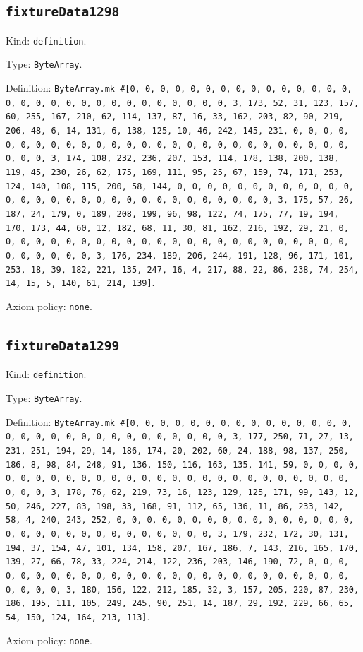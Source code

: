 \documentclass[11pt]{article}
\begin{document}
\subsection*{\texttt{fixtureData1298}}
\noindent Kind: \texttt{definition}.\par
\noindent Type: \texttt{ByteArray}.\par
\noindent Definition: \texttt{ByteArray.mk \#[0, 0, 0, 0, 0, 0, 0, 0, 0, 0, 0, 0, 0, 0, 0, 0, 0, 0, 0, 0, 0, 0, 0, 0, 0, 0, 0, 0, 0, 0, 3, 173, 52, 31, 123, 157, 60, 255, 167, 210, 62, 114, 137, 87, 16, 33, 162, 203, 82, 90, 219, 206, 48, 6, 14, 131, 6, 138, 125, 10, 46, 242, 145, 231, 0, 0, 0, 0, 0, 0, 0, 0, 0, 0, 0, 0, 0, 0, 0, 0, 0, 0, 0, 0, 0, 0, 0, 0, 0, 0, 0, 0, 0, 0, 3, 174, 108, 232, 236, 207, 153, 114, 178, 138, 200, 138, 119, 45, 230, 26, 62, 175, 169, 111, 95, 25, 67, 159, 74, 171, 253, 124, 140, 108, 115, 200, 58, 144, 0, 0, 0, 0, 0, 0, 0, 0, 0, 0, 0, 0, 0, 0, 0, 0, 0, 0, 0, 0, 0, 0, 0, 0, 0, 0, 0, 0, 0, 0, 3, 175, 57, 26, 187, 24, 179, 0, 189, 208, 199, 96, 98, 122, 74, 175, 77, 19, 194, 170, 173, 44, 60, 12, 182, 68, 11, 30, 81, 162, 216, 192, 29, 21, 0, 0, 0, 0, 0, 0, 0, 0, 0, 0, 0, 0, 0, 0, 0, 0, 0, 0, 0, 0, 0, 0, 0, 0, 0, 0, 0, 0, 0, 0, 3, 176, 234, 189, 206, 244, 191, 128, 96, 171, 101, 253, 18, 39, 182, 221, 135, 247, 16, 4, 217, 88, 22, 86, 238, 74, 254, 14, 15, 5, 140, 61, 214, 139]}.\par
\noindent Axiom policy: \texttt{none}.\par
\subsection*{\texttt{fixtureData1299}}
\noindent Kind: \texttt{definition}.\par
\noindent Type: \texttt{ByteArray}.\par
\noindent Definition: \texttt{ByteArray.mk \#[0, 0, 0, 0, 0, 0, 0, 0, 0, 0, 0, 0, 0, 0, 0, 0, 0, 0, 0, 0, 0, 0, 0, 0, 0, 0, 0, 0, 0, 0, 3, 177, 250, 71, 27, 13, 231, 251, 194, 29, 14, 186, 174, 20, 202, 60, 24, 188, 98, 137, 250, 186, 8, 98, 84, 248, 91, 136, 150, 116, 163, 135, 141, 59, 0, 0, 0, 0, 0, 0, 0, 0, 0, 0, 0, 0, 0, 0, 0, 0, 0, 0, 0, 0, 0, 0, 0, 0, 0, 0, 0, 0, 0, 0, 3, 178, 76, 62, 219, 73, 16, 123, 129, 125, 171, 99, 143, 12, 50, 246, 227, 83, 198, 33, 168, 91, 112, 65, 136, 11, 86, 233, 142, 58, 4, 240, 243, 252, 0, 0, 0, 0, 0, 0, 0, 0, 0, 0, 0, 0, 0, 0, 0, 0, 0, 0, 0, 0, 0, 0, 0, 0, 0, 0, 0, 0, 0, 0, 3, 179, 232, 172, 30, 131, 194, 37, 154, 47, 101, 134, 158, 207, 167, 186, 7, 143, 216, 165, 170, 139, 27, 66, 78, 33, 224, 214, 122, 236, 203, 146, 190, 72, 0, 0, 0, 0, 0, 0, 0, 0, 0, 0, 0, 0, 0, 0, 0, 0, 0, 0, 0, 0, 0, 0, 0, 0, 0, 0, 0, 0, 0, 0, 3, 180, 156, 122, 212, 185, 32, 3, 157, 205, 220, 87, 230, 186, 195, 111, 105, 249, 245, 90, 251, 14, 187, 29, 192, 229, 66, 65, 54, 150, 124, 164, 213, 113]}.\par
\noindent Axiom policy: \texttt{none}.\par
\end{document}
